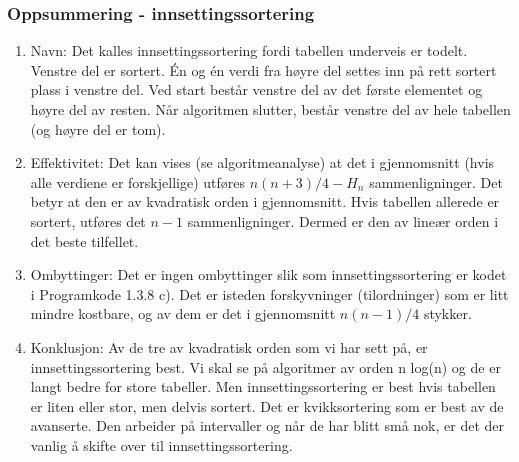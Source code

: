 \documentclass[11pt]{article}
\begin{document}
        \subsubsection{Oppsummering - innsettingssortering}
            \begin{enumerate}
                \item Navn: Det kalles innsettingssortering fordi tabellen underveis er todelt. Venstre del
                    er sortert. Én og én verdi fra høyre del settes inn på rett sortert plass i venstre del. Ved
                    start består venstre del av det første elementet og høyre del av resten. Når algoritmen
                    slutter, består venstre del av hele tabellen (og høyre del er tom).

                \item Effektivitet: Det kan vises (se algoritmeanalyse) at det i gjennomsnitt (hvis alle
                    verdiene er forskjellige) utføres $n(n + 3)/4 - H_n$ sammenligninger. Det betyr at den er
                    av kvadratisk orden i gjennomsnitt. Hvis tabellen allerede er sortert, utføres det $n - 1$
                    sammenligninger. Dermed er den av lineær orden i det beste tilfellet.

                \item Ombyttinger: Det er ingen ombyttinger slik som innsettingssortering er kodet i
                    Programkode 1.3.8 c). Det er isteden forskyvninger (tilordninger) som er litt mindre
                    kostbare, og av dem er det i gjennomsnitt $n(n - 1)/4$ stykker.

                \item Konklusjon: Av de tre av kvadratisk orden som vi har sett på, er innsettingssortering
                    best. Vi skal se på algoritmer av orden n log(n) og de er langt bedre for store tabeller.
                    Men innsettingssortering er best hvis tabellen er liten eller stor, men delvis sortert. Det
                    er kvikksortering som er best av de avanserte. Den arbeider på intervaller og når
                    de har blitt små nok, er det der vanlig å skifte over til innsettingssortering.
            \end{enumerate}
\end{document}
